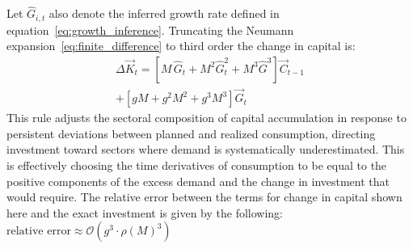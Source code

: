Let $\hat{G}_{i,t}$ also denote the inferred growth rate defined in
equation~\eqref{eq:growth_inference}.
Truncating the Neumann expansion~\eqref{eq:finite_difference} to
third order the change in capital is:
%
\begin{multline}\label{eq:investment_rule}
     \Delta \vec{K}_{t}
    = \left[M\,\hat{G}_{t} + M^{2}\hat{G}_{t}^{2} + M^3  \hat{G}^{3}\right]
      \vec{C}_{t-1} \\ + \left[gM + g^2M^2 + g^3 M^3\right] \vec{G}_{t}
\end{multline}
%
This rule adjusts the sectoral composition of capital accumulation in
response to persistent deviations between planned and realized
consumption, directing investment toward sectors where demand is
systematically underestimated. This is effectively choosing the time derivatives of consumption to be equal to the positive components of the excess demand and the change in investment that would require. The relative error between the terms for change in capital shown here and the exact investment is given by the following: $ \text{relative error} \approx \mathcal{O}(g^{3} \cdot \rho(M)^{3})$
